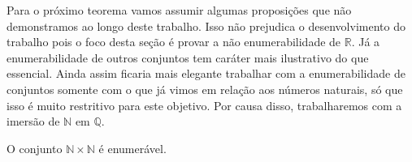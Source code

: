 \documentclass[../main.tex]{subfiles}
\begin{document}
Para o próximo teorema vamos assumir algumas proposições que não demonstramos ao longo deste trabalho. Isso não prejudica o desenvolvimento do trabalho pois o foco desta seção é provar a não enumerabilidade de $\mathbb{R}$. Já a enumerabilidade de outros conjuntos tem caráter mais ilustrativo do que essencial. Ainda assim ficaria mais elegante trabalhar com a enumerabilidade de conjuntos somente com o que já vimos em relação aos números naturais, só que isso é muito restritivo para este objetivo. Por causa disso, trabalharemos com a imersão de $\mathbb{N}$ em $\mathbb{Q}$.
\begin{teo}\label{enum-teo-NxNEnumeravel}
    O conjunto $\mathbb{N} \times \mathbb{N}$ é enumerável.
\end{teo}
\end{document}
